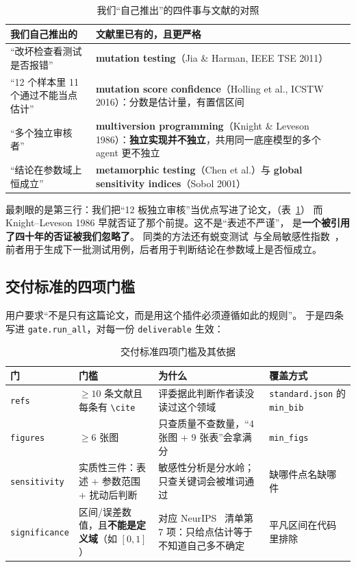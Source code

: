 \documentclass[11pt,a4paper]{article}
\newcommand{\code}[1]{\texttt{#1}}
\begin{document}
\begin{table}[tbp]\centering\small
\caption{我们“自己推出”的四件事与文献的对照}\label{tab:literature}
\setlength{\tabcolsep}{3pt}
\begin{tabular}{p{5.2cm}p{7.4cm}}
\toprule
我们自己推出的 & 文献里已有的，且更严格\\
\midrule
“改坏检查看测试是否报错” & \textbf{mutation testing}（Jia \& Harman, IEEE TSE 2011）\\
“12 个样本里 11 个通过不能当点估计” & \textbf{mutation score confidence}（Holling et al., ICSTW 2016）：分数是估计量，有置信区间\\
“多个独立审核者” & \textbf{multiversion programming}（Knight \& Leveson 1986）：\textbf{独立实现并不独立}，共用同一底座模型的多个 agent 更不独立\\
“结论在参数域上恒成立” & \textbf{metamorphic testing}（Chen et al.）与 \textbf{global sensitivity indices}（Sobol 2001）\\
\bottomrule
\end{tabular}
\end{table}

最刺眼的是第三行：我们把“12 板独立审核”当优点写进了论文，（表~\ref{tab:literature}）
而 Knight--Leveson 1986 早就否证了那个前提。这不是“表述不严谨”，
是\textbf{一个被引用了四十年的否证被我们忽略了}。
同类的方法还有蜕变测试~\cite{ref4}与全局敏感性指数~\cite{ref5}，前者用于生成下一批测试用例，后者用于判断结论在参数域上是否恒成立。


\subsection{交付标准的四项门槛}
用户要求“不是只有这篇论文，而是用这个插件必须遵循如此的规则”。
于是四条写进 \code{gate.run\_all}，对每一份 \code{deliverable} 生效：

\begin{table}[tbp]\centering\small
\caption{交付标准四项门槛及其依据}\label{tab:delivery}
\setlength{\tabcolsep}{3pt}
\begin{tabular}{lp{3.2cm}p{5.2cm}p{2.6cm}}
\toprule
门 & 门槛 & 为什么 & 覆盖方式\\
\midrule
\code{refs} & $\ge 10$ 条文献且每条有 \code{\textbackslash cite} & 评委据此判断作者读没读过这个领域 & \code{standard.json} 的 \code{min\_bib}\\
\code{figures} & $\ge 6$ 张图 & 只查质量不查数量，“4 张图 + 9 张表”会拿满分 & \code{min\_figs}\\
\code{sensitivity} & 实质性三件：表述 + 参数范围 + 扰动后判断 & 敏感性分析是分水岭；只查关键词会被堆词通过 & 缺哪件点名缺哪件\\
\code{significance} & 区间/误差数值，且\textbf{不能是定义域}（如 $[0,1]$） & 对应 NeurIPS~\cite{ref9} 清单第 7 项：只给点估计等于不知道自己多不确定 & 平凡区间在代码里排除\\
\bottomrule
\end{tabular}
\end{table}
\end{document}

